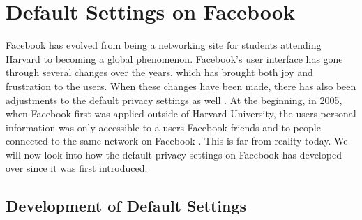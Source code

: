 \section{Default Settings on Facebook}\label{sec:default_privacy_settings}

Facebook has evolved from being a networking site for students attending Harvard to becoming a global phenomenon. Facebook's user interface has gone through several changes over the years, which has brought both joy and frustration to the users. When these changes have been made, there has also been adjustments to the default privacy settings as well \cite{EvoPriv2}. At the beginning, in 2005, when Facebook first was applied outside of Harvard University, the users personal information was only accessible to a users Facebook friends and to people connected to the same network on Facebook \cite{EvoPriv}. This is far from reality today. We will now look into how the default privacy settings on Facebook has developed over since it was first introduced. 


\subsection{Development of Default Settings}




